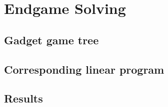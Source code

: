 \chapter{Endgame Solving}

\section{Gadget game tree}

\section{Corresponding linear program}

\section{Results}
